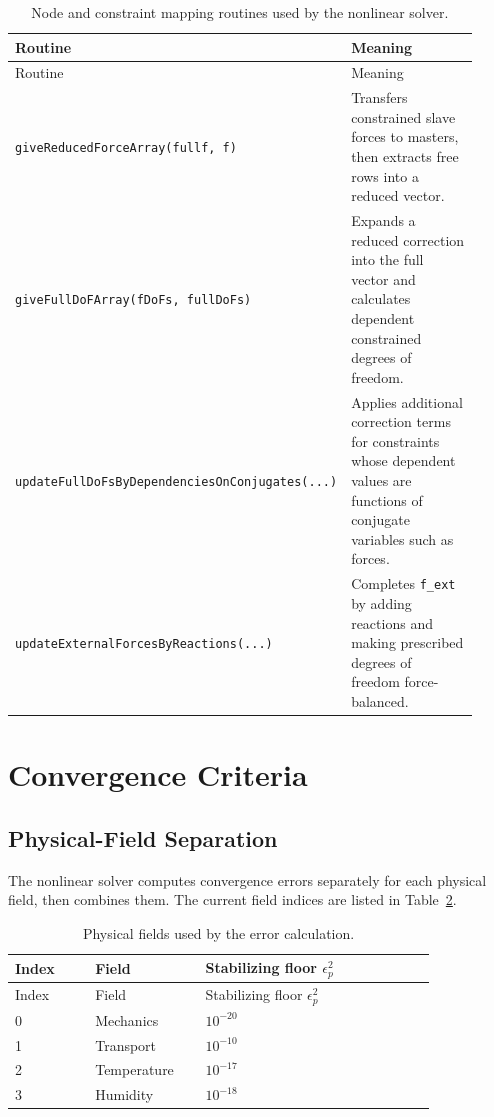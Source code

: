 \documentclass[11pt,a4paper]{article}
\newcommand{\code}[1]{\ifmmode\text{\texttt{\detokenize{#1}}}\else\nolinkurl{#1}\fi}
\begin{document}
\begin{longtable}{p{0.48\linewidth} p{0.44\linewidth}}
\caption{Node and constraint mapping routines used by the nonlinear solver.}
\label{tab:mapping-routines}\\
\toprule
Routine & Meaning \\
\midrule
\endfirsthead
\toprule
Routine & Meaning \\
\midrule
\endhead
\code{giveReducedForceArray(fullf, f)} &
Transfers constrained slave forces to masters, then extracts free rows into a
reduced vector. \\

\code{giveFullDoFArray(fDoFs, fullDoFs)} &
Expands a reduced correction into the full vector and calculates dependent
constrained degrees of freedom. \\

\code{updateFullDoFsByDependenciesOnConjugates(...)} &
Applies additional correction terms for constraints whose dependent values are
functions of conjugate variables such as forces. \\

\code{updateExternalForcesByReactions(...)} &
Completes \code{f_ext} by adding reactions and making prescribed degrees of
freedom force-balanced. \\
\bottomrule
\end{longtable}

\section{Convergence Criteria}

\subsection{Physical-Field Separation}

The nonlinear solver computes convergence errors separately for each physical
field, then combines them.  The current field indices are listed in
Table~\ref{tab:physical-fields}.

\begin{longtable}{p{0.16\linewidth} p{0.22\linewidth} p{0.46\linewidth}}
\caption{Physical fields used by the error calculation.}
\label{tab:physical-fields}\\
\toprule
Index & Field & Stabilizing floor \(\epsilon_p^2\) \\
\midrule
\endfirsthead
\toprule
Index & Field & Stabilizing floor \(\epsilon_p^2\) \\
\midrule
\endhead
0 & Mechanics & \(10^{-20}\) \\
1 & Transport & \(10^{-10}\) \\
2 & Temperature & \(10^{-17}\) \\
3 & Humidity & \(10^{-18}\) \\
\bottomrule
\end{longtable}
\end{document}
